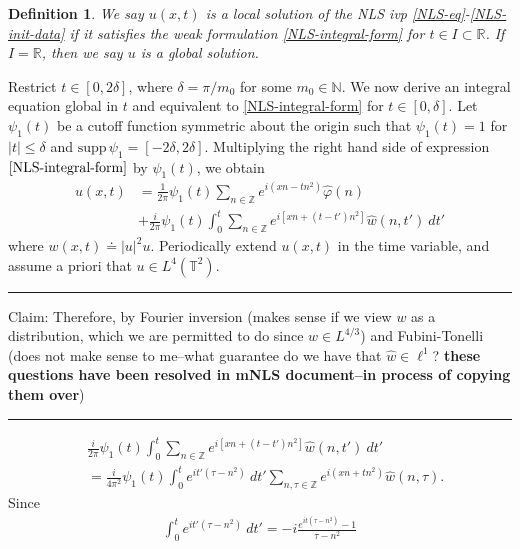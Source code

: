 \documentclass[12pt,reqno]{amsart}
\newcommand{\wh}{\widehat}
\newcommand{\rr}{\mathbb{R}}
\newcommand{\zz}{\mathbb{Z}}
\newcommand{\ci}{\mathbb{T}}
\newcommand{\vp}{\varphi}
\theoremstyle{plain}  %
\newtheorem{definition}{Definition}
\begin{document}
\begin{definition}
	We say $u(x,t)$ is a \emph{local solution} of the NLS ivp
\eqref{NLS-eq}-\eqref{NLS-init-data} if it satisfies the weak formulation 
\eqref{NLS-integral-form} for $t \in I \subset \rr$. If $I = \rr$, then we say 
$u$ is a \emph{global solution}. 
%
%
\end{definition}
%
%
Restrict $t \in [0, 2\delta]$, where $\delta = \pi/m_0$ for some $m_0 \in 
\mathbb{N}$. We now derive an integral 
equation global in $t$ and equivalent to \eqref{NLS-integral-form} for $t 
\in [0, \delta]$. Let $\psi_1(t)$ be a cutoff function symmetric about the 
origin such that $\psi_1(t) = 1$ for $|t| \le \delta$ and $\text{supp} \, \psi_1 
= 
[-2\delta, 2\delta ]$. Multiplying the right hand side of expression 
$\eqref{NLS-integral-form}$ by $\psi_1(t)$, we obtain
%
%
\begin{equation}
	\begin{split}
		\label{cutoff-int-eq}
		u(x, t)
		& = \frac{1}{2 \pi} \psi_1(t) \sum_{n \in \zz} e^{i(xn - tn^{2
		})} \widehat{\vp}(n) 
		\\
		& + \frac{i }{2 \pi} \psi_1(t) \int_0^t \sum_{n \in \zz} 
		e^{i\left[ xn + (t - t')n^2 \right]} \wh{w}(n, t') \ dt'
	\end{split}
\end{equation}
%
%
where $w(x, t) \doteq |u|^2 u$. Periodically extend $u(x, t)$ in the time 
variable, and assume a priori that $u \in 
L^4(\ci^2)$. 
\\
\hrule
Claim: Therefore, by Fourier inversion (makes sense if we view $w$ as a 
distribution, which we are permitted to do since $w \in L^{4/3}$) and 
Fubini-Tonelli (does not make sense to me--what guarantee 
do we have that $\wh{w} \in \ell^1$? \textbf{these questions have been resolved 
in mNLS document--in process of copying them over})
\\
\hrule
%
\begin{equation}
	\label{prim-int-form}
	\begin{split}
		& \frac{i }{2 \pi} \psi_1(t) \int_0^t \sum_{n \in \zz} 
		e^{i\left[ xn + (t - t')n^2 \right]} \wh{w}(n, t') \ dt'
		\\
		& = \frac{i }{4 \pi^2} \psi_1(t)
		\int_0^t 
		e^{it'(\tau - n^2)} \ dt' 
		\sum_{n, \tau \in \zz} e^{i(xn + tn^2)} \wh{w}(n, \tau) .
	\end{split}
\end{equation}
Since
%
%
\begin{equation*}
	\begin{split}
		\int_0^t e^{it'(\tau - n^2)} \ dt' = -i \frac{e^{it(\tau - n^{2  
		})}- 1}{\tau - n^2}
	\end{split}
\end{equation*}
\end{document}
